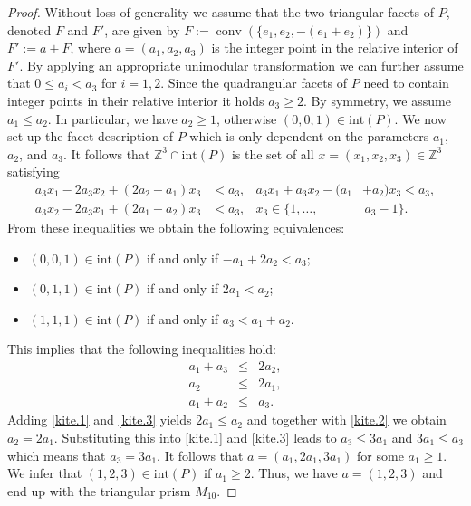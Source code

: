 \documentclass[a4paper]{article}
\theoremstyle{plain}
\begin{document}
\begin{proof}
Without loss of generality we assume that the two triangular
facets of $P$, denoted $F$ and $F'$, are given by
$F := {{\mathop{\mathrm{{conv}}}}}(\{e_1, e_2, -(e_1 + e_2)\})$ and $F' := a + F$,
where $a = (a_1, a_2, a_3)$ is the integer point in the
relative interior of $F'$.
By applying an appropriate unimodular transformation we can
further assume that $0 \leq a_i < a_3$ for $i = 1,2$.
Since the quadrangular facets of $P$ need to contain integer
points in their relative interior it holds $a_3 \geq 2$.
By symmetry, we assume $a_1 \leq a_2$.
In particular, we have $a_2 \geq 1$, otherwise $(0,0,1) \in
{\mathrm{int}}(P)$.
We now set up the facet description of $P$ which is only
dependent on the parameters $a_1$, $a_2$, and $a_3$.
It follows that ${\mathbb{Z}}^3 \cap {\mathrm{int}}(P)$ is the set of all
$x = (x_1, x_2, x_3) \in {\mathbb{Z}}^3$ satisfying
\begin{align*}
  a_3 x_1 - 2 a_3 x_2 + (2a_2 - a_1) x_3 & < a_3, &
  a_3 x_1 + a_3 x_2 - (a_1 &+ a_2) x_3 < a_3, \\
  a_3 x_2 - 2 a_3 x_1 + (2a_1 - a_2) x_3 & < a_3, &
  x_3 \in \{1,\ldots, &\,a_3 - 1\}.
\end{align*}
From these inequalities we obtain the following
equivalences:
\begin{itemize} 
  \item $(0,0,1) \in {\mathrm{int}}(P)$ if and only if $-a_1 + 2a_2 < a_3$;
  \item $(0,1,1) \in {\mathrm{int}}(P)$ if and only if $2a_1 < a_2$;  
  \item $(1,1,1) \in {\mathrm{int}}(P)$ if and only if $a_3 < a_1 + a_2$. 
\end{itemize}
This implies that the following inequalities hold:
\begin{eqnarray}
  a_1 + a_3 & \le & 2 a_2, \label{kite.1} \\
  a_2       & \le & 2 a_1, \label{kite.2} \\
  a_1 + a_2 & \le & a_3. \label{kite.3}
\end{eqnarray}
Adding \eqref{kite.1} and \eqref{kite.3} yields $2 a_1 \leq
a_2$ and together with \eqref{kite.2} we obtain $a_2 = 2
a_1$.
Substituting this into \eqref{kite.1} and \eqref{kite.3}
leads to $a_3 \leq 3 a_1$ and $3 a_1 \leq a_3$ which means
that $a_3 = 3 a_1$.
It follows that $a = (a_1, 2a_1, 3a_1)$ for some $a_1 \geq
1$.
We infer that $(1,2,3) \in {\mathrm{int}}(P)$ if $a_1 \geq 2$.
Thus, we have $a = (1,2,3)$ and end up with the triangular
prism $M_{10}$.
\end{proof}
\end{document}
